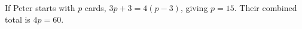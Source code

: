 If Peter starts with $p$ cards, $3p+3=4(p-3)$, giving $p=15$. Their combined total is $4p=\boxed{60}$.
